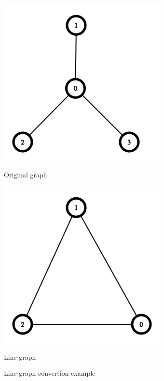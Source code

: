 \begin{figure}[H]
    \centering

    \begin{minipage}[b]{0.4\textwidth}
    \includegraphics[width=\textwidth]{figures/linegraphbigexample}
    \caption{Original graph}
  \end{minipage}
  \hfill
  \begin{minipage}[b]{0.4\textwidth}
    \includegraphics[width=\textwidth]{figures/linegraphnigexample2}
    \caption{Line graph}
  \end{minipage}

    \caption{Line graph convertion example }
    \label{linegraphbigexamplet}
\end{figure}

